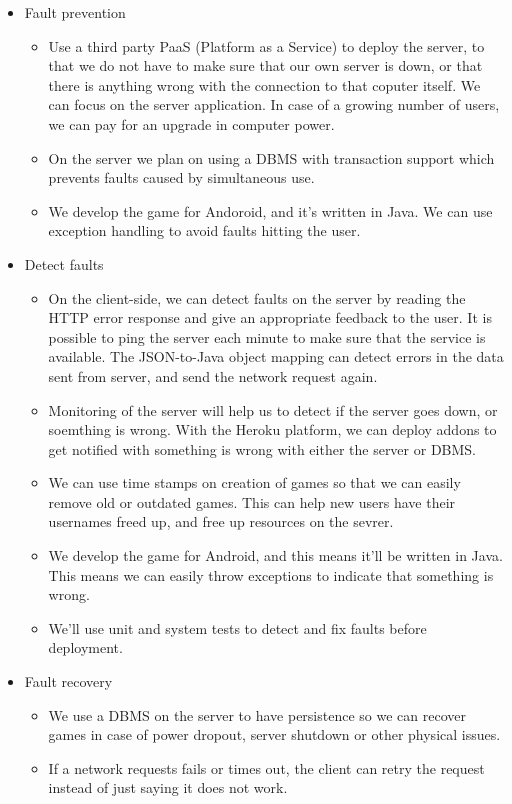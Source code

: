 \begin{itemize}
    \item Fault prevention
    \begin{itemize}
        \item Use a third party PaaS (Platform as a Service) to deploy the server, to that we do not have to make sure that our own server is down, or that there is anything wrong with the connection to that coputer itself. We can focus on the server application. In case of a growing number of users, we can pay for an upgrade in computer power.
        \item On the server we plan on using a DBMS with transaction support which prevents faults caused by simultaneous use.
         \item We develop the game for Andoroid, and it's written in Java. We can use exception handling to avoid faults hitting the user.
    \end{itemize}
    \item Detect faults 
    \begin{itemize}
        \item On the client-side, we can detect faults on the server by reading the HTTP error response and give an appropriate feedback to the user. It is possible to ping the server each minute to make sure that the service is available. The JSON-to-Java object mapping can detect errors in the data sent from server, and send the network request again. 
        \item Monitoring of the server will help us to detect if the server goes down, or soemthing is wrong. With the Heroku platform, we can deploy addons to get notified with something is wrong with either the server or DBMS. \cite{heroku-stillalive} 
        \item We can use time stamps on creation of games so that we can easily remove old or outdated games. This can help new users have their usernames freed up, and free up resources on the sevrer.
        \item We develop the game for Android, and this means it'll be written in Java. This means we can easily throw exceptions to indicate that something is wrong.
        \item We'll use unit and system tests to detect and fix faults before deployment.
    \end{itemize}
    \item Fault recovery
    \begin{itemize}
        \item We use a DBMS on the server to have persistence so we can recover games in case of power dropout, server shutdown or other physical issues. 
        \item If a network requests fails or times out, the client can retry the request instead of just saying it does not work.
    \end{itemize}
    
\end{itemize}
